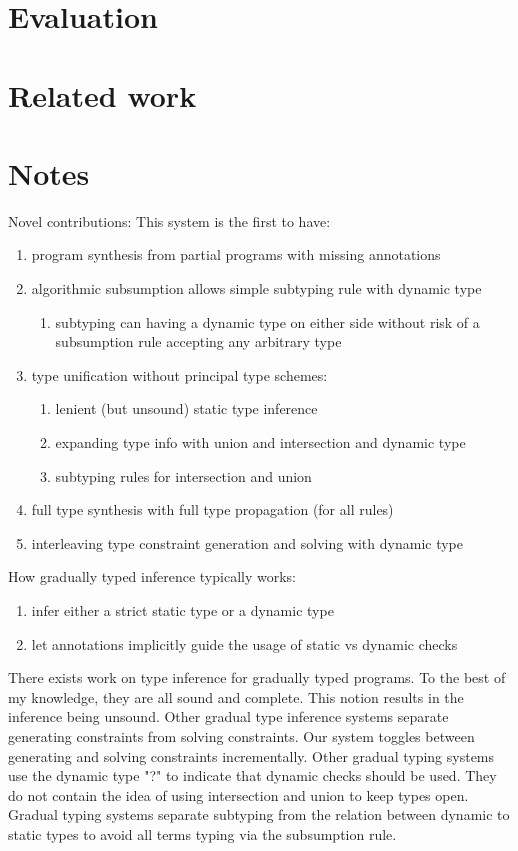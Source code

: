 \documentclass[sigplan,screen]{acmart}
\begin{document}
\section{Evaluation}

\section{Related work}

\section*{Notes}

Novel contributions: This system is the first to have:
\begin{enumerate}
  \item program synthesis from partial programs with missing annotations  
  \item algorithmic subsumption allows simple subtyping rule with dynamic type
    \begin{enumerate}
      \item subtyping can having a dynamic type on either side without risk of   
        a subsumption rule accepting any arbitrary type
    \end{enumerate}
  \item type unification without principal type schemes: 
    \begin{enumerate}
      \item lenient (but unsound) static type inference
      \item expanding type info with union and intersection and dynamic type
      \item subtyping rules for intersection and union 
    \end{enumerate}
  \item full type synthesis with full type propagation (for all rules)
  \item interleaving type constraint generation and solving with dynamic type 
\end{enumerate}

How gradually typed inference typically works:
\begin{enumerate}
  \item infer either a strict static type or a dynamic type
  \item let annotations implicitly guide the usage of static vs dynamic checks 
\end{enumerate}


There exists work on type inference for gradually typed programs.
To the best of my knowledge, they are all sound and complete.
This notion results in the inference being unsound.
Other gradual type inference systems separate 
generating constraints from solving constraints.
Our system toggles between generating and solving constraints incrementally.
Other gradual typing systems use the dynamic type "?" to indicate 
that dynamic checks should be used.
They do not contain the idea of using intersection and union to keep types open.
Gradual typing systems separate subtyping from the relation 
between dynamic to static types to avoid all terms typing via the subsumption rule.
\end{document}
